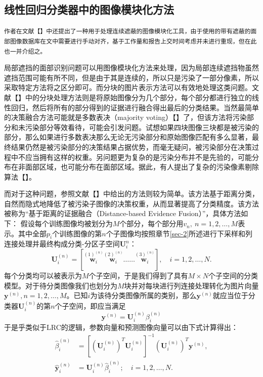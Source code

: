 \documentclass[UTF8]{ctexart}
\begin{document}
\subsection{线性回归分类器中的图像模块化方法}
\texttt{作者在文献【】中还提出了一种用于处理连续遮蔽的图像模块化工具，由于使用的带有遮蔽的面部图像数据库在文中需要进行手动对齐，基于工作量和报告上交时间考虑并未进行重现，但在此也一并介绍之。}\par
局部遮挡的面部识别问题可以用图像模块化方法来处理，因为局部连续遮挡物虽然遮挡范围可能有所不同，但是由于其是连续的，所以只是污染了一部分像素，所以采取特定方法将之区分即可。而分块的图片表示方法可以有效地处理这类问题。文献【】中的分块处理方法则是将原始图像分为几个部分，每个部分都进行独立的线性回归，然后将所有的部分得到的证据进行融合得出最后的分类结果。当然最简单的决策融合方法可能就是多数表决（majority voting）【】了，但该方法将污染部分和未污染部分等效看待，可能会引发问题。试想如果四块图像三块都是被污染的部分，那么如果进行多数表决那么无论无污染部分和原始图像匹配有多么显著，最终结果仍然是被污染部分的决策结果占据优势，而毫无疑问，被污染部分在决策过程中不应当拥有这样的权重。另问题更为复杂的是污染分布并不是先验的，可能分布在非面部区域，也可能分布在面部区域。据此，有人提出了复杂的污染像素剔除算法【】。\par
而对于这种问题，参照文献【】中给出的方法则较为简单。该方法基于距离分类，自然而隐式地降低了被污染子图像的决策权重，从而显著提高了分类精度。该方法被称为“基于距离的证据融合（Distance-based Evidence Fusion）”，具体方法如下：
假设每个训练图像均被划分为\(M\)个部分，每个部分用\(v_n,\ n=1,2,\dots,M\)表示。其中全部\(p_i\)个训练图像的第\(n\)个子图像均按照章节\ref{sec-2}所述进行下采样和列连接处理并最终构成分类-分区子空间\(\mathbf{U}^{n}_i\)：
\begin{equation}
    \mathbf{U}^{(n)}_i=[\stackrel{(1)^{(n)}}{\mathbf{w}_i}\stackrel{(2)^{(n)}}{\mathbf{w}_i}\ldots\ldots\stackrel{(3)^{(n)}}{\mathbf{w}_i}],\quad i=1,2,\dots,N.
\end{equation}
每个分类均可以被表示为\(M\)个子空间，于是我们得到了具有\(M\times N\)个子空间的分类模型。对于待分类图像我们也划分为\(M\)块并对每块进行列连接处理转化为图片向量\(\mathbf{y}^{(n)},n=1,2,\dots,M\)。已知\(i\)为该待分类图像所属的类别，那么\(\mathbf{y}^{(n)}\)就应当位于分类器\(\mathbf{U}^{(n)}_i\)的第\(n\)个子空间，即应当满足
\begin{equation}
    \mathbf{y}^{(n)}=\mathbf{U}^{(n)}_i\beta^{(n)}_i
\end{equation}
于是乎类似于LRC的逻辑，参数向量和预测图像向量可以由下式计算得出：
\begin{align}
    \hat{\beta}^{(n)}_i&={[(\mathbf{U}^{(n)}_i)^T\mathbf{U}^{(n)}_i]}^{-1}(\mathbf{U}^{(n)}_i)^T\mathbf{y}^{(n)},\\
    \hat{\mathbf{y}}^{(n)}_i&=\mathbf{U}^{(n)}_i{\hat{\beta}}^{(n)}_i;\quad i=1,2,\dots,N.
\end{align}
\end{document}
